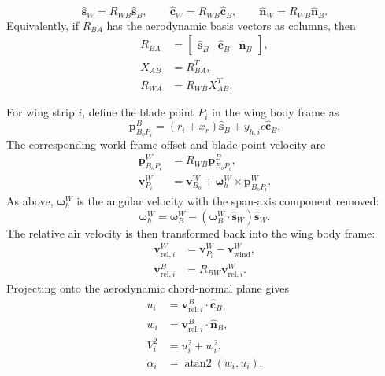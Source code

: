 \documentclass{article}
\begin{document}
\begin{equation}
    \hat{\mathbf{s}}_W = R_{WB}\hat{\mathbf{s}}_B,
    \qquad
    \hat{\mathbf{c}}_W = R_{WB}\hat{\mathbf{c}}_B,
    \qquad
    \hat{\mathbf{n}}_W = R_{WB}\hat{\mathbf{n}}_B.
\end{equation}
Equivalently, if \(R_{BA}\) has the aerodynamic basis vectors as columns, then
\begin{align}
    R_{BA}
        &=
        \begin{bmatrix}
            \hat{\mathbf{s}}_B &
            \hat{\mathbf{c}}_B &
            \hat{\mathbf{n}}_B
        \end{bmatrix}, \\
    X_{AB} &= R_{BA}^{T}, \\
    R_{WA} &= R_{WB}X_{AB}^{T}.
\end{align}

For wing strip \(i\), define the blade point \(P_i\) in the wing body frame as
\begin{equation}
    \mathbf{p}_{B_oP_i}^{B}
    =
    (r_i + x_r)\hat{\mathbf{s}}_B
    + y_{h,i}\bar{c}\hat{\mathbf{c}}_B.
\end{equation}
The corresponding world-frame offset and blade-point velocity are
\begin{align}
    \mathbf{p}_{B_oP_i}^{W}
        &= R_{WB}\mathbf{p}_{B_oP_i}^{B}, \\
    \mathbf{v}_{P_i}^{W}
        &= \mathbf{v}_{B_o}^{W}
        + \boldsymbol{\omega}_{h}^{W}
        \times \mathbf{p}_{B_oP_i}^{W}.
\end{align}
As above, \(\boldsymbol{\omega}_{h}^{W}\) is the angular velocity with the span-axis component removed:
\begin{equation}
    \boldsymbol{\omega}_{h}^{W}
    =
    \boldsymbol{\omega}_{B}^{W}
    -
    \left(
        \boldsymbol{\omega}_{B}^{W}
        \cdot
        \hat{\mathbf{s}}_W
    \right)
    \hat{\mathbf{s}}_W.
\end{equation}
The relative air velocity is then transformed back into the wing body frame:
\begin{align}
    \mathbf{v}_{\mathrm{rel},i}^{W}
        &= \mathbf{v}_{P_i}^{W}
        - \mathbf{v}_{\mathrm{wind}}^{W}, \\
    \mathbf{v}_{\mathrm{rel},i}^{B}
        &= R_{BW}\mathbf{v}_{\mathrm{rel},i}^{W}.
\end{align}
Projecting onto the aerodynamic chord-normal plane gives
\begin{align}
    u_i &= \mathbf{v}_{\mathrm{rel},i}^{B}\cdot\hat{\mathbf{c}}_B, \\
    w_i &= \mathbf{v}_{\mathrm{rel},i}^{B}\cdot\hat{\mathbf{n}}_B, \\
    V_i^2 &= u_i^2 + w_i^2, \\
    \alpha_i &= \operatorname{atan2}(w_i,u_i).
\end{align}
\end{document}
